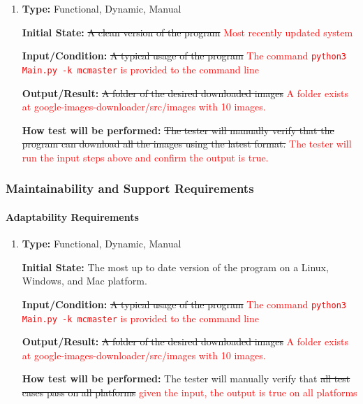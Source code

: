 \documentclass[12pt, titlepage]{article}
\begin{document}
\begin{enumerate}[label=NFR-IAR\arabic*:, wide=0pt, leftmargin=*]

\item \phantom{empty}

\textbf{Type:} Functional, Dynamic, Manual
					
\textbf{Initial State:} \sout{A clean version of the program} \textcolor{red}{Most recently updated system}
					
\textbf{Input/Condition:} \sout{A typical usage of the program}
\textcolor{red}{The command \texttt{python3 Main.py -k mcmaster} is provided to the command line}
					
\textbf{Output/Result:} \sout{A folder of the desired downloaded images}
\textcolor{red}{A folder exists at google-images-downloader/src/images with 10 images.}
					
\textbf{How test will be performed:} \sout{The tester will manually verify that the program can download 
all the images using the latest format.}
\textcolor{red}{The tester will run the input steps above and confirm the output is true.}

\end{enumerate}

\subsubsection{Maintainability and Support Requirements}
		
\paragraph{Adaptability Requirements}

\begin{enumerate}[label=NFR-ADR\arabic*:, wide=0pt, leftmargin=*]

\item \phantom{empty}

\textbf{Type:} Functional, Dynamic, Manual
					
\textbf{Initial State:} The most up to date version of the program on a Linux, Windows, and Mac platform.
					
\textbf{Input/Condition:} \sout{A typical usage of the program}
\textcolor{red}{The command \texttt{python3 Main.py -k mcmaster} is provided to the command line}
					
\textbf{Output/Result:} \sout{A folder of the desired downloaded images}
\textcolor{red}{A folder exists at google-images-downloader/src/images with 10 images.}
					
\textbf{How test will be performed:} The tester will manually verify that \sout{all test cases pass on all platforms} 
\textcolor{red}{given the input, the output is true on all platforms}

\end{enumerate}
\end{document}
